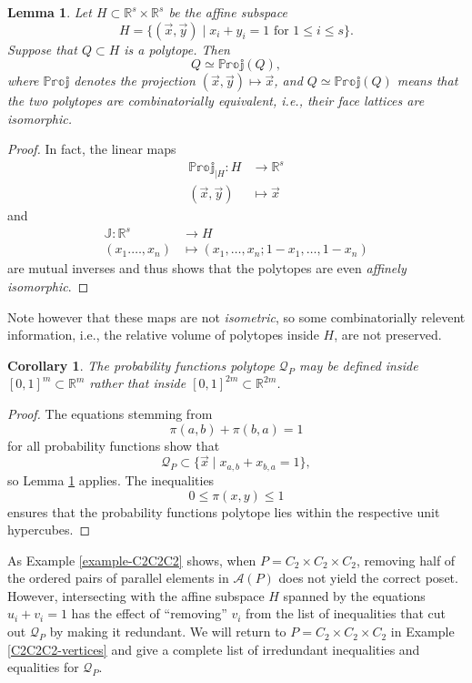 \documentclass[11pt,a4paper,abstract=yes]{scrartcl}
\theoremstyle{plain}
\newtheorem{lemma}[theorem]{Lemma}
\newtheorem{corollary}[theorem]{Corollary}
\newcommand{\RR}{\mathbb{R}}
\newcommand{\prpolytope}[1]{\mathcal{Q}_{#1}}
\newcommand{\twoanti}[1]{\mathcal{A}({#1})}
\begin{document}
\begin{lemma}
Let \(H \subset \RR^{s} \times \RR^{s}\) be the affine subspace
\[H = \{(\vec{x}, \vec{y}) \mid x_{i} + y_{i} = 1 \text{ for } 1 \le i \le s\}.\]
Suppose that \(Q \subset H\) is a polytope. Then
\[
Q  \simeq \mathbb{Proj}(Q),
\] 
where \(\mathbb{Proj}\) denotes the projection \((\vec{x},\vec{y}) \mapsto \vec{x}\),
and \(Q \simeq \mathbb{Proj}(Q)\) means that the two polytopes
are \emph{combinatorially equivalent}, i.e., their face lattices are isomorphic.
\label{lemma-project}
\end{lemma}
\begin{proof}
In fact, the linear maps
\begin{align*}
  \mathbb{Proj}_{\lvert H}: H & \to \RR^{s} \\
  (\vec{x},\vec{y}) & \mapsto \vec{x}
\end{align*}
and
\begin{align*}
  \mathbb{J}: \RR^{s} & \to H \\
  (x_{1}.\dots,x_{n}) & \mapsto (x_{1},\dots, x_{n}; 1 - x_{1},\dots, 1 - x_{n})
\end{align*}
are mutual inverses and thus shows that the polytopes are even \emph{affinely isomorphic}.
\end{proof}
Note however that these maps are not \emph{isometric}, so some combinatorially relevent information, i.e.,
the relative volume of polytopes inside \(H\), are not preserved.
\begin{corollary}
The probability functions polytope \(\prpolytope{P}\) may be defined inside
\([0,1]^{m} \subset \RR^m\) rather that inside \([0,1]^{2m} \subset \RR^{2m}\).
\end{corollary}
\begin{proof}
The equations stemming from \[\pi(a,b) + \pi(b,a)=1\] for all probability functions
show that \[\prpolytope{P} \subset \{\vec{x} \mid x_{a,b} + x_{b,a}=1\},\]
so Lemma \ref{lemma-project} applies. The inequalities \[0 \le \pi(x,y) \le 1\] ensures that the probability functions polytope lies
within the respective unit hypercubes.
\end{proof}

As Example \ref{example-C2C2C2} shows, when \(P=C_{2} \times C_{2} \times C_{2}\),
removing half of the ordered pairs of parallel elements in
\(\twoanti{P}\) does not yield the correct poset. However, intersecting with the affine subspace
\(H\) spanned by the equations \(u_{i} + v_{i}=1\) has the effect of ``removing'' \(v_{i}\)
from the list of inequalities that cut out \(\prpolytope{P}\) by making it redundant.
We will return to \(P=C_{2} \times C_{2} \times C_{2}\) in Example \ref{C2C2C2-vertices} and give a complete list
of irredundant inequalities and equalities for \(\prpolytope{P}\).
\end{document}
